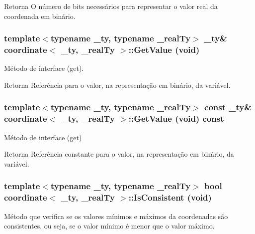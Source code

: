 \begin{DoxyReturn}{Retorna}
O número de bits necessários para representar o valor real da coordenada em binário. 
\end{DoxyReturn}
\hypertarget{classcoordinate_a46e04592c97e4d4f10aad3cbe90a7a6a}{
\subsubsection[{GetValue}]{\setlength{\rightskip}{0pt plus 5cm}template$<$typename \_\-ty, typename \_\-realTy$>$ \_\-ty\& {\bf coordinate}$<$ \_\-ty, \_\-realTy $>$::GetValue (void)}}
\label{classcoordinate_a46e04592c97e4d4f10aad3cbe90a7a6a}
Método de interface (get).

\begin{DoxyReturn}{Retorna}
Referência para o valor, na representação em binário, da variável. 
\end{DoxyReturn}
\hypertarget{classcoordinate_a67e7c384fd0641455b6629a7d6a9a344}{
\subsubsection[{GetValue}]{\setlength{\rightskip}{0pt plus 5cm}template$<$typename \_\-ty, typename \_\-realTy$>$ const \_\-ty\& {\bf coordinate}$<$ \_\-ty, \_\-realTy $>$::GetValue (void) const}}
\label{classcoordinate_a67e7c384fd0641455b6629a7d6a9a344}
Método de interface (get)

\begin{DoxyReturn}{Retorna}
Referência constante para o valor, na representação em binário, da variável. 
\end{DoxyReturn}
\hypertarget{classcoordinate_aa77bd1b22e652f61ced9ff8ef76fcbd9}{
\subsubsection[{IsConsistent}]{\setlength{\rightskip}{0pt plus 5cm}template$<$typename \_\-ty, typename \_\-realTy$>$ bool {\bf coordinate}$<$ \_\-ty, \_\-realTy $>$::IsConsistent (void)}}
\label{classcoordinate_aa77bd1b22e652f61ced9ff8ef76fcbd9}
Método que verifica se os valores mínimos e máximos da coordenadas são consistentes, ou seja, se o valor mínimo é menor que o valor máximo.

